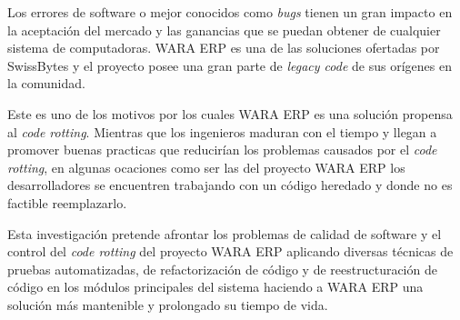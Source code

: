 \linespread{1.25}
\thispagestyle{empty}
\noindent
Los errores de software o mejor conocidos como \textit{bugs} tienen un gran impacto en la aceptación del mercado y las ganancias que se puedan obtener de cualquier sistema de computadoras. WARA ERP es una de las soluciones ofertadas por SwissBytes y el proyecto posee una gran parte de \textit{legacy code} de sus orígenes en la comunidad.

\vspace{5mm}

\noindent
Este es uno de los motivos por los cuales WARA ERP es una solución propensa al \textit{code rotting}. Mientras que los ingenieros maduran con el tiempo y llegan a promover buenas practicas que reducirían los problemas causados por  el  \textit{code rotting}, en algunas ocaciones como ser las del proyecto WARA ERP los desarrolladores se encuentren trabajando con un código heredado y donde no es factible reemplazarlo.   

\vspace{5mm}

\noindent
Esta investigación pretende afrontar los problemas de calidad de software y el control del \textit{code rotting} del proyecto WARA ERP aplicando diversas técnicas de pruebas automatizadas, de refactorización de código y de reestructuración de código en los módulos principales del sistema haciendo a WARA ERP una solución más mantenible y prolongado su tiempo de vida.

